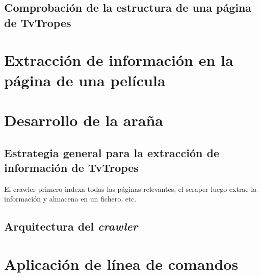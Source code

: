 \subsection{Comprobación de la estructura de una página de TvTropes}

\section{Extracción de información en la página de una película}

\section{Desarrollo de la araña}

\subsection{Estrategia general para la extracción de información de TvTropes}
El crawler primero indexa todas las páginas relevantes, el scraper luego extrae
la información y almacena en un fichero, etc.

\subsection{Arquitectura del \textit{crawler}}

\section{Aplicación de línea de comandos}
